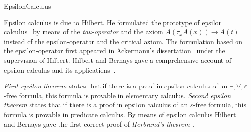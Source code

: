 \begin{entry}{EpsilonCalculus}
\begin{history}
Epsilon calculus is due to Hilbert.  He formulated the prototype of
epsilon calculus~\cite{Hilbert1923} by means of the
\emph{tau-operator} and the axiom \(A(\tau_x A(x)) \to A(t)\) instead
of the epsilon-operator and the critical axiom.  The formulation based
on the epsilon-operator first appeared in Ackermann's
dissertation~\cite{Ackermann1924} under the supervision of Hilbert.
Hilbert and Bernays gave a comprehensive account of epsilon calculus
and its applications~\cite{HilbertBernays1939}.
\end{history}

\begin{technicalities}
\emph{First epsilon theorem} states that if there is a proof in
epsilon calculus of an $\exists,\forall,\varepsilon$-free formula,
this formula is provable in elementary calculus.  \emph{Second epsilon
  theorem} states that if there is a proof in epsilon calculus of an
$\varepsilon$-free formula, this formula is provable in predicate
calculus.  By means of epsilon calculus Hilbert and Bernays gave the
first correct proof of \emph{Herbrand's
  theorem}~\cite{HilbertBernays1939,MoserZach06}.
\end{technicalities}



%
%
%
%
%
%
% 
%






\end{entry}
